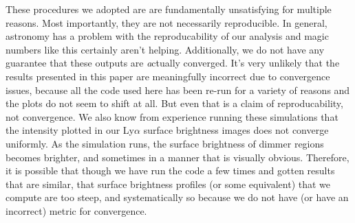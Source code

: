 These procedures we adopted are are fundamentally unsatisfying for multiple reasons.
Most importantly, they are not necessarily reproducible.
In general, astronomy has a problem with the reproducability of our analysis and magic numbers like this certainly aren't helping.
Additionally, we do not have any guarantee that these outputs are {\emph actually} converged.
It's very unlikely that the results presented in this paper are meaningfully incorrect due to convergence issues, because all the code used here has been re-run for a variety of reasons and the plots do not seem to shift at all.
But even that is a claim of reproducability, not convergence.
We also know from experience running these simulations that the intensity plotted in our Ly$\alpha$ surface brightness images does not converge uniformly.
As the simulation runs, the surface brightness of dimmer regions becomes brighter, and sometimes in a manner that is visually obvious.
Therefore, it is possible that though we have run the code a few times and gotten results that are similar, that surface brightness profiles (or some equivalent) that we compute are too steep, and systematically so because we do not have (or have an incorrect) metric for convergence.

